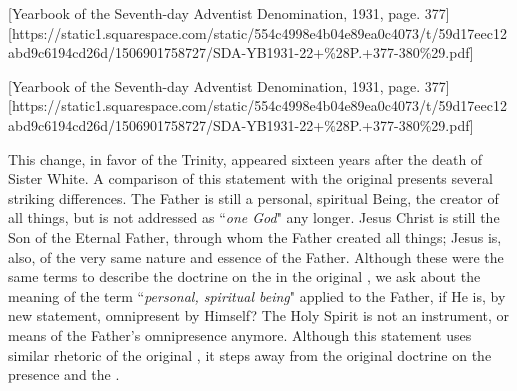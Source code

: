 



[Yearbook of the Seventh-day Adventist Denomination, 1931, page. 377][https://static1.squarespace.com/static/554c4998e4b04e89ea0c4073/t/59d17eec12abd9c6194cd26d/1506901758727/SDA-YB1931-22+\%28P.+377-380\%29.pdf]


[Yearbook of the Seventh-day Adventist Denomination, 1931, page. 377][https://static1.squarespace.com/static/554c4998e4b04e89ea0c4073/t/59d17eec12abd9c6194cd26d/1506901758727/SDA-YB1931-22+\%28P.+377-380\%29.pdf]


This change, in favor of the Trinity, appeared sixteen years after the death of Sister White. A comparison of this statement with the original  presents several striking differences. The Father is still a personal, spiritual Being, the creator of all things, but is not addressed as “\textit{one God}" any longer. Jesus Christ is still the Son of the Eternal Father, through whom the Father created all things; Jesus is, also, of the very same nature and essence of the Father. Although these were the same terms to describe the doctrine on the  in the original , we ask about the meaning of the term “\textit{personal, spiritual being}" applied to the Father, if He is, by new statement, omnipresent by Himself? The Holy Spirit is not an instrument, or means of the Father’s omnipresence anymore. Although this statement uses similar rhetoric of the original , it steps away from the original doctrine on the presence and the .


